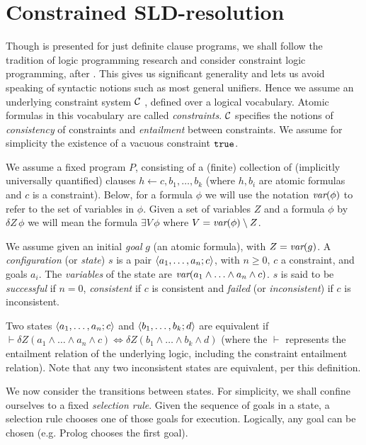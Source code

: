 \documentclass{article} %
\begin{document}
\section{Constrained SLD-resolution}
Though \cite{Cohen-2015} is presented for just definite clause programs, we shall follow the tradition of logic programming research and consider constraint logic programming, after \cite{Jaffar-1987}. This gives us significant generality and lets us avoid speaking of syntactic notions such as most general unifiers. Hence we assume an underlying constraint system $\cal C$ \cite{Saraswat-1992}, defined over a logical vocabulary. Atomic formulas in this vocabulary are called {\em constraints}. $\cal C$ specifies the notions of {\em consistency} of constraints and {\em entailment} between constraints. We assume for simplicity the existence of a vacuous constraint $\mbox{\tt true}$. 

We assume a fixed program $P$, consisting of a (finite) collection of (implicitly universally quantified) clauses $h \leftarrow c, b_1, \ldots, b_k$ (where $h, b_i$ are atomic formulas and $c$ is a constraint).  Below, for a formula $\phi$ we will use the notation $\mbox{\em var}(\phi)$ to refer to the set of variables in $\phi$. Given a set of variables $Z$ and a formula $\phi$ by $\delta Z\, \phi$ we will mean the formula $\exists V\,\phi$ where $V=\mbox{\em var}(\phi)\setminus Z$. 

We assume given an initial {\em goal} $g$ (an atomic formula), with $Z=\mbox{\em var}(g)$. A {\em configuration} (or {\em state}) $s$ is a pair $\langle a_1, \ldots, a_n; c\rangle$, with $n\geq 0$, $c$ a constraint, and goals $a_i$. The {\em variables} of the state are $\mbox{\em var}(a_1\wedge\ldots\wedge a_n\wedge c)$. $s$ is said to be {\em successful} if $n=0$, {\em consistent} if $c$ is consistent and {\em failed} (or {\em inconsistent}) if $c$ is inconsistent. 

Two states $\langle a_1, \ldots, a_n; c\rangle$ and $\langle b_1, \ldots, b_k; d\rangle$ are equivalent if $\vdash \delta Z (a_1 \wedge \ldots \wedge a_n \wedge c) \Leftrightarrow \delta Z (b_1 \wedge \ldots \wedge b_k \wedge d)$ (where the $\vdash$ represents the entailment relation of the underlying logic, including the constraint entailment relation). Note that any two inconsistent states are equivalent, per this definition. 

We now consider the transitions between states. For simplicity, we shall confine ourselves to a fixed {\em selection rule}. Given the sequence of goals in a state, a selection rule chooses one of those goals for execution. Logically, any goal can be chosen (e.g.{} Prolog chooses the first goal).
\end{document}
